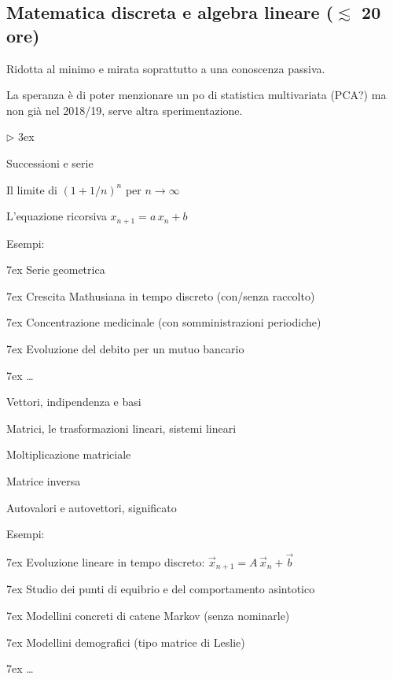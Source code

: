 \documentclass[10pt]{article}
\newcommand{\mylabel}[1]{#1\hfill}
\renewenvironment{itemize}
  {\begin{list}{$\triangleright$}{%
   \baselineskip3ex
   \setlength{\parskip}{4mm}
   \setlength{\topsep}{.4\baselineskip}
   \setlength{\rightmargin}{0mm}
   \setlength{\listparindent}{0mm}
   \setlength{\itemindent}{0mm}
   \setlength{\labelwidth}{2ex}
   \setlength{\itemsep}{.4\baselineskip}
   \setlength{\parsep}{0mm}
   \setlength{\partopsep}{0mm}
   \setlength{\labelsep}{1ex}
   \setlength{\leftmargin}{\labelwidth+\labelsep}
   \let\makelabel\mylabel}}{%
   \end{list}\vspace*{-1.3mm}}
\begin{document}
\clearpage
\subsection{Matematica discreta e algebra lineare (\boldmath$\lesssim$ 20 ore) }
\colorbox{blue!10}{\begin{minipage}{\textwidth}
Ridotta al minimo e mirata soprattutto a una conoscenza passiva.\medskip 

La speranza è di poter menzionare un po di statistica multivariata (PCA?) ma non già nel 2018/19, serve altra sperimentazione.
\end{minipage}}
\begin{itemize}

\item Successioni e serie \hfill{}

Il limite di $(1+1/n)^n$ per $n\to\infty$\hfill{}

\item L'equazione ricorsiva $x_{n+1} = a\, x_n+b$\hfill{}

  Esempi:\hfill{}

  \noindent\kern7ex Serie geometrica

  \noindent\kern7ex Crescita Mathusiana in tempo discreto (con/senza raccolto)
  
  \noindent\kern7ex Concentrazione medicinale (con somministrazioni periodiche)
  
  \noindent\kern7ex Evoluzione del debito per un mutuo bancario
  
  \noindent\kern7ex \ldots\hfill{} 

\item Vettori, indipendenza e basi\hfill{}

  Matrici, le trasformazioni lineari, sistemi lineari
  
  Moltiplicazione matriciale\hfill{}
  
  Matrice inversa\hfill{}
  
  Autovalori e autovettori, significato\hfill{}
   
  Esempi:
  
  \noindent\kern7ex Evoluzione lineare in tempo discreto: $\vec {x}_{n+1} = A\,\vec {x}_n +  \vec b$\hfill{}
  
  \noindent\kern7ex Studio dei punti di equibrio e del comportamento asintotico
  
  \noindent\kern7ex Modellini concreti di catene Markov (senza nominarle)
  
  \noindent\kern7ex Modellini demografici (tipo matrice di Leslie)
  
  \noindent\kern7ex \ldots\hfill{} 

\end{itemize}
\end{document}
